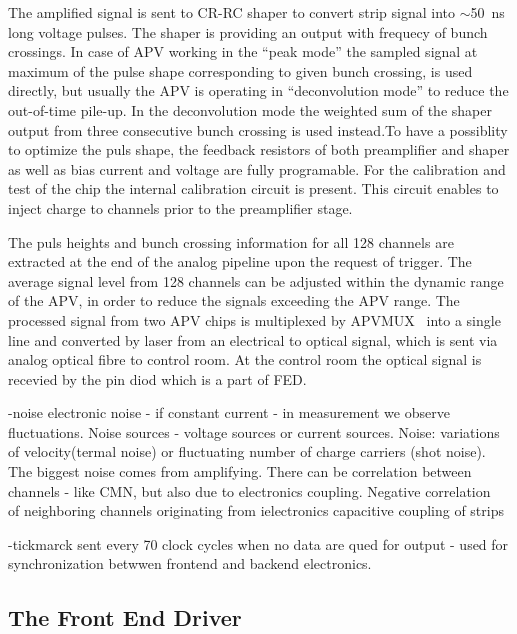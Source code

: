 The amplified signal is sent to CR-RC shaper to convert strip signal into $\sim$50~ns long voltage pulses. The shaper is providing an output with frequecy of bunch crossings. In case of APV working in the ``peak mode'' the sampled signal at maximum of the pulse shape corresponding to given bunch crossing, is used directly, but usually the APV is operating in ``deconvolution mode'' to reduce the out-of-time pile-up. In the deconvolution mode the weighted sum of the shaper output from three consecutive bunch crossing is used instead.To have a possiblity to optimize the puls shape, the feedback resistors of both preamplifier and shaper as well as  bias current and voltage are fully programable. For the calibration and test of the chip the internal calibration circuit is present. This circuit enables to inject charge to channels prior to the preamplifier stage.

The puls heights and bunch crossing information for all 128 channels are extracted at the end of the analog pipeline upon the request of trigger. The average signal level from 128 channels can be adjusted within the dynamic range of the APV, in order to reduce the signals exceeding the APV range. The processed signal from two APV chips is multiplexed by APVMUX~\cite{Ball:2007zza} into a single line and converted by laser from an electrical to optical signal, which is sent via analog optical fibre to control room. At the control room the optical signal is recevied by the pin diod which is a part of FED.

-noise
electronic noise - if constant current - in measurement we observe fluctuations. Noise sources - voltage sources or current sources. Noise: variations of velocity(termal noise) or fluctuating number of charge carriers (shot noise). The biggest noise comes from amplifying. There can be correlation between channels - like CMN, but also due to electronics coupling. Negative correlation~\cite{Lutz:1987wd} of neighboring channels originating from ielectronics capacitive coupling of strips

-tickmarck sent every 70 clock cycles when no data are qued for output -  used for synchronization betwwen frontend and backend electronics.

\subsection{The Front End Driver}

